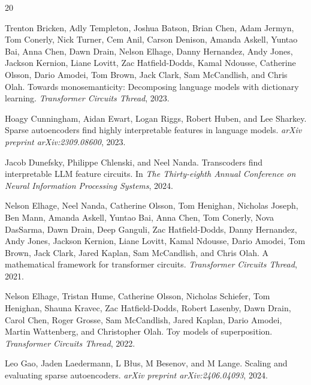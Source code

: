 \documentclass{article}
\begin{document}
\begin{thebibliography}{20}

Trenton Bricken, Adly Templeton, Joshua Batson, Brian Chen, Adam Jermyn, Tom Conerly, Nick Turner, Cem Anil, Carson Denison, Amanda Askell, Yuntao Bai, Anna Chen, Dawn Drain, Nelson Elhage, Danny Hernandez, Andy Jones, Jackson Kernion, Liane Lovitt, Zac Hatfield-Dodds, Kamal Ndousse, Catherine Olsson, Dario Amodei, Tom Brown, Jack Clark, Sam McCandlish, and Chris Olah.
\newblock Towards monosemanticity: Decomposing language models with dictionary learning.
\newblock \emph{Transformer Circuits Thread}, 2023.

Hoagy Cunningham, Aidan Ewart, Logan Riggs, Robert Huben, and Lee Sharkey.
\newblock Sparse autoencoders find highly interpretable features in language models.
\newblock \emph{arXiv preprint arXiv:2309.08600}, 2023.

Jacob Dunefsky, Philippe Chlenski, and Neel Nanda.
\newblock Transcoders find interpretable {LLM} feature circuits.
\newblock In \emph{The Thirty-eighth Annual Conference on Neural Information Processing Systems}, 2024.

Nelson Elhage, Neel Nanda, Catherine Olsson, Tom Henighan, Nicholas Joseph, Ben Mann, Amanda Askell, Yuntao Bai, Anna Chen, Tom Conerly, Nova DasSarma, Dawn Drain, Deep Ganguli, Zac Hatfield-Dodds, Danny Hernandez, Andy Jones, Jackson Kernion, Liane Lovitt, Kamal Ndousse, Dario Amodei, Tom Brown, Jack Clark, Jared Kaplan, Sam McCandlish, and Chris Olah.
\newblock A mathematical framework for transformer circuits.
\newblock \emph{Transformer Circuits Thread}, 2021.

Nelson Elhage, Tristan Hume, Catherine Olsson, Nicholas Schiefer, Tom Henighan, Shauna Kravec, Zac Hatfield-Dodds, Robert Lasenby, Dawn Drain, Carol Chen, Roger Grosse, Sam McCandlish, Jared Kaplan, Dario Amodei, Martin Wattenberg, and Christopher Olah.
\newblock Toy models of superposition.
\newblock \emph{Transformer Circuits Thread}, 2022.

Leo Gao, Jaden Laedermann, L B{\l}us, M Besenov, and M Lange.
\newblock Scaling and evaluating sparse autoencoders.
\newblock \emph{arXiv preprint arXiv:2406.04093}, 2024.


\end{thebibliography}
\end{document}
